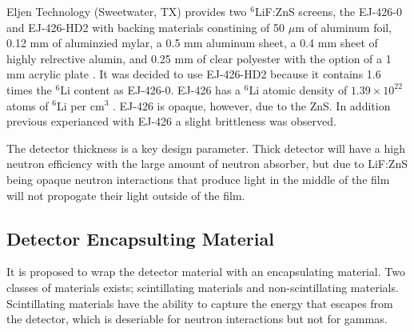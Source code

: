 Eljen Technology (Sweetwater, TX) provides two ${}^6$LiF:ZnS screens, the EJ-426-0 and EJ-426-HD2 with backing materials constining of 50 $\mu$m of aluminum foil, 0.12 mm of aluminzied mylar, a 0.5 mm aluminum sheet, a 0.4 mm sheet of highly relrective alumin, and 0.25 mm of clear polyester with the option of a 1 mm acrylic plate \cite{_ej-426_2012}.
It was decided to use EJ-426-HD2 because it contains 1.6 times the ${}^{6}$Li content as EJ-426-0. EJ-426 has a ${}^{6}$Li atomic density of $1.39\times10^{22}$ atoms of ${}^6$Li per cm${}^3$ \cite{_ej-426_2012}. EJ-426 is opaque, however, due to the ZnS.  In addition previous experianced with EJ-426 a slight brittleness was observed.

The detector thickness is a key design parameter. 
Thick detector will have a high neutron efficiency with the large amount of neutron absorber, but due to LiF:ZnS being opaque neutron interactions that produce light in the middle of the film will not propogate their light outside of the film.

\subsection{Detector Encapsulting Material}
It is proposed to wrap the detector material with an encapsulating material.
Two classes of materials exists; scintillating materials and non-scintillating materials.  
Scintillating materials have the ability to capture the energy that escapes from the detector, which is deseriable for neutron interactions but not for gammas.


